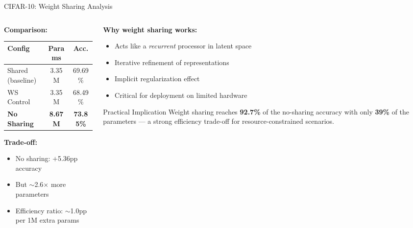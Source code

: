 \documentclass[aspectratio=169,11pt]{beamer}
\begin{document}
\begin{frame}[shrink=5]{CIFAR-10: Weight Sharing Analysis}
  \begin{columns}[T]
    \begin{column}{0.48\textwidth}
      \textbf{Comparison:}
      \begin{table}
        \centering\small
        \begin{tabular}{lcc}
          \toprule
          \textbf{Config} & \textbf{Params} & \textbf{Acc.} \\
          \midrule
          Shared (baseline) & 3.35M & 69.69\% \\
          WS Control & 3.35M & 68.49\% \\
          \textbf{No Sharing} & \textbf{8.67M} & \textbf{73.85\%} \\
          \bottomrule
        \end{tabular}
      \end{table}

      \vspace{0.5em}
      \textbf{Trade-off:}
      \begin{itemize}
        \item No sharing: $+$5.36pp accuracy
        \item But $\sim$2.6$\times$ more parameters
        \item Efficiency ratio: $\sim$1.0pp per 1M extra params
      \end{itemize}
    \end{column}
    \begin{column}{0.48\textwidth}
      \textbf{Why weight sharing works:}
      \begin{itemize}
        \item Acts like a \textit{recurrent} processor in latent space
        \item Iterative refinement of representations
        \item Implicit regularization effect
        \item Critical for deployment on limited hardware
      \end{itemize}

      \vspace{0.5em}
      \begin{block}{Practical Implication}
        Weight sharing reaches \textbf{92.7\%} of the no-sharing accuracy with only \textbf{39\%} of the parameters --- a strong efficiency trade-off for resource-constrained scenarios.
      \end{block}
    \end{column}
  \end{columns}
\end{frame}
\end{document}

